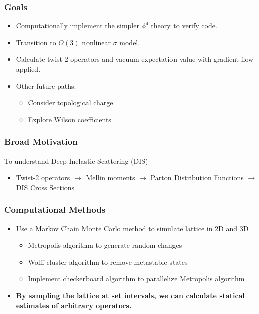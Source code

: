 \documentclass{beamer}
\begin{document}
\begin{frame}
    \frametitle{Goals}
    \begin{itemize}
        \item Computationally implement the simpler $\phi^4$ theory to verify code.
        \item Transition to $O(3)$ nonlinear $\sigma$ model.
        \item Calculate twist-2 operators and vacuum expectation value with gradient flow applied.
        \item Other future paths:
            \begin{itemize}
                \item Consider topological charge
                \item Explore Wilson coefficients 
            \end{itemize}

    \end{itemize}
\end{frame}

\begin{frame}
    \frametitle{Broad Motivation}
    To understand Deep Inelastic Scattering (DIS)
    \begin{itemize}
        \item Twist-2 operators $\rightarrow$ Mellin moments $\rightarrow$ Parton Distribution Functions $\rightarrow$ DIS Cross Sections
    \end{itemize}
\end{frame}

\begin{frame}
    \frametitle{Computational Methods}
\begin{itemize}
    \item Use a Markov Chain Monte Carlo method to simulate lattice in 2D and 3D
        \begin{itemize}
            \item Metropolis algorithm to generate random changes
            \item Wolff cluster algorithm to remove metastable states
            \item Implement checkerboard algorithm to parallelize Metropolis algorithm
        \end{itemize}

    \item \textbf{By sampling the lattice at set intervals, we can calculate statical estimates of arbitrary operators.}
\end{itemize}

\end{frame}
\end{document}
